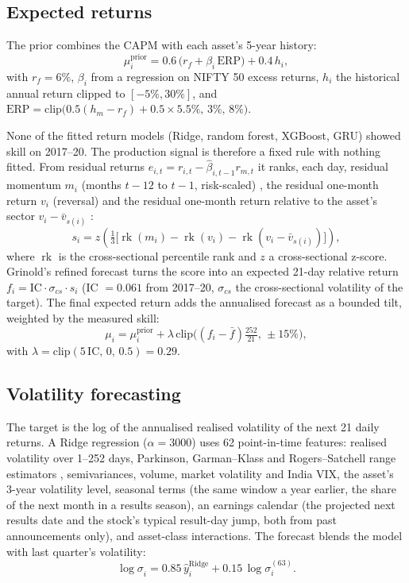 \documentclass[conference]{IEEEtran}
\begin{document}
\subsection{Expected returns}
The prior combines the CAPM with each asset's 5-year history:
\begin{equation}
\mu_i^{\text{prior}} = 0.6\,\big(r_f + \beta_i\,\text{ERP}\big) + 0.4\,h_i,
\end{equation}
with $r_f = 6\%$, $\beta_i$ from a regression on NIFTY 50 excess returns, $h_i$ the historical annual return clipped to $[-5\%, 30\%]$, and $\text{ERP} = \text{clip}\big(0.5(h_m - r_f) + 0.5 \times 5.5\%,\,3\%,\,8\%\big)$.

None of the fitted return models (Ridge, random forest, XGBoost, GRU) showed skill on 2017--20. The production signal is therefore a fixed rule with nothing fitted. From residual returns $e_{i,t} = r_{i,t} - \hat\beta_{i,t-1} r_{m,t}$ it ranks, each day, residual momentum $m_i$ (months $t{-}12$ to $t{-}1$, risk-scaled) \cite{blitz2011}, the residual one-month return $v_i$ (reversal) and the residual one-month return relative to the asset's sector $v_i - \bar v_{s(i)}$ \cite{da2014}:
\begin{equation}
s_i = z\!\left(\tfrac{1}{3}\big[\operatorname{rk}(m_i) - \operatorname{rk}(v_i) - \operatorname{rk}(v_i - \bar v_{s(i)})\big]\right),
\end{equation}
where $\operatorname{rk}$ is the cross-sectional percentile rank and $z$ a cross-sectional z-score. Grinold's refined forecast \cite{grinold2000} turns the score into an expected 21-day relative return $f_i = \text{IC} \cdot \sigma_{cs} \cdot s_i$ (IC $= 0.061$ from 2017--20, $\sigma_{cs}$ the cross-sectional volatility of the target). The final expected return adds the annualised forecast as a bounded tilt, weighted by the measured skill:
\begin{equation}
\mu_i = \mu_i^{\text{prior}} + \lambda\,\text{clip}\!\big((f_i - \bar f)\tfrac{252}{21},\,\pm 15\%\big),
\end{equation}
with $\lambda = \text{clip}(5\,\text{IC},\,0,\,0.5) = 0.29$.

\subsection{Volatility forecasting}
The target is the log of the annualised realised volatility of the next 21 daily returns. A Ridge regression ($\alpha = 3000$) uses 62 point-in-time features: realised volatility over 1--252 days, Parkinson, Garman--Klass and Rogers--Satchell range estimators \cite{parkinson1980,garman1980,rogers1991}, semivariances, volume, market volatility and India VIX, the asset's 3-year volatility level, seasonal terms (the same window a year earlier, the share of the next month in a results season), an earnings calendar (the projected next results date and the stock's typical result-day jump, both from past announcements only), and asset-class interactions. The forecast blends the model with last quarter's volatility:
\begin{equation}
\widehat{\log\sigma}_{i} = 0.85\,\hat y_i^{\text{Ridge}} + 0.15\,\log\sigma_{i}^{(63)}.
\end{equation}
\end{document}
